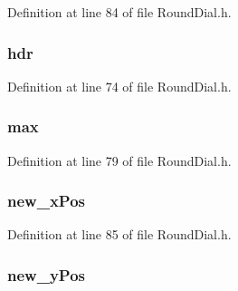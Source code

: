 Definition at line 84 of file Round\+Dial.\+h.

\hypertarget{struct_r_o_u_n_d_d_i_a_l_abeffaf353197a8a64fba6707b68ce0be}{}
\subsubsection[{hdr}]{ hdr}\label{struct_r_o_u_n_d_d_i_a_l_abeffaf353197a8a64fba6707b68ce0be}


Definition at line 74 of file Round\+Dial.\+h.

\hypertarget{struct_r_o_u_n_d_d_i_a_l_ada9062a8cfa28dadad3430074dcb167e}{}
\subsubsection[{max}]{ max}\label{struct_r_o_u_n_d_d_i_a_l_ada9062a8cfa28dadad3430074dcb167e}


Definition at line 79 of file Round\+Dial.\+h.

\hypertarget{struct_r_o_u_n_d_d_i_a_l_afa74eab00bfed86dc0bdc5c3e694ba66}{}
\subsubsection[{new\+\_\+x\+Pos}]{ new\+\_\+x\+Pos}\label{struct_r_o_u_n_d_d_i_a_l_afa74eab00bfed86dc0bdc5c3e694ba66}


Definition at line 85 of file Round\+Dial.\+h.

\hypertarget{struct_r_o_u_n_d_d_i_a_l_afd7bfd3561821f2e8aedb2f141a433ab}{}
\subsubsection[{new\+\_\+y\+Pos}]{ new\+\_\+y\+Pos}\label{struct_r_o_u_n_d_d_i_a_l_afd7bfd3561821f2e8aedb2f141a433ab}


